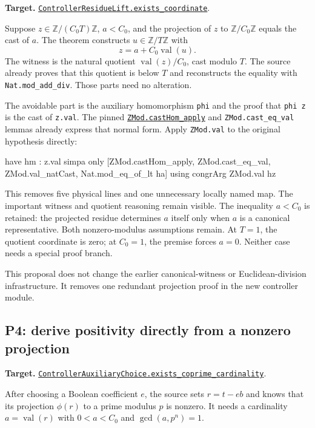 \documentclass[11pt]{article}
\newcommand{\code}[1]{\nolinkurl{#1}}
\newcommand{\repo}[2]{\href{https://github.com/VladimirReshetnikov/ProveIt/blob/7df43cdfacb490cd3ca3acd23e39027efebf8801/Computability/DiophantineConsistency/#1}{#2}}
\newcommand{\ml}[2]{\href{https://github.com/leanprover-community/mathlib4/blob/81a5d257c8e410db227a6665ed08f64fea08e997/Mathlib/#1}{#2}}
\begin{document}
\textbf{Target.} \repo{Lean/DiophantineConsistency/ControllerResidueLift.lean}{\code{ControllerResidueLift.exists_coordinate}}.

Suppose $z\in\mathbb Z/(C_0T)\mathbb Z$, $a<C_0$, and the projection of $z$ to $\mathbb Z/C_0\mathbb Z$ equals the cast of $a$. The theorem constructs $u\in\mathbb Z/T\mathbb Z$ with
\[
 z=a+C_0\operatorname{val}(u).
\]
The witness is the natural quotient $\operatorname{val}(z)/C_0$, cast modulo $T$. The source already proves that this quotient is below $T$ and reconstructs the equality with \code{Nat.mod_add_div}. Those parts need no alteration.

The avoidable part is the auxiliary homomorphism \code{phi} and the proof that \code{phi z} is the cast of \code{z.val}. The pinned \ml{Data/ZMod/Basic.lean}{\code{ZMod.castHom_apply}} and \code{ZMod.cast_eq_val} lemmas already express that normal form. Apply \code{ZMod.val} to the original hypothesis directly:

\begin{Lean}
  have hm : z.val %
    simpa only [ZMod.castHom_apply, ZMod.cast_eq_val,
      ZMod.val_natCast, Nat.mod_eq_of_lt ha]
      using congrArg ZMod.val hz
\end{Lean}

This removes five physical lines and one unnecessary locally named map. The important witness and quotient reasoning remain visible. The inequality $a<C_0$ is retained: the projected residue determines $a$ itself only when $a$ is a canonical representative. Both nonzero-modulus assumptions remain. At $T=1$, the quotient coordinate is zero; at $C_0=1$, the premise forces $a=0$. Neither case needs a special proof branch.

This proposal does not change the earlier canonical-witness or Euclidean-division infrastructure. It removes one redundant projection proof in the new controller module.

\subsection{P4: derive positivity directly from a nonzero projection}

\textbf{Target.} \repo{Lean/DiophantineConsistency/ControllerAuxiliaryChoice.lean}{\code{ControllerAuxiliaryChoice.exists_coprime_cardinality}}.

After choosing a Boolean coefficient $e$, the source sets $r=t-eb$ and knows that its projection $\phi(r)$ to a prime modulus $p$ is nonzero. It needs a cardinality $a=\operatorname{val}(r)$ with $0<a<C_0$ and $\gcd(a,p^n)=1$.
\end{document}
